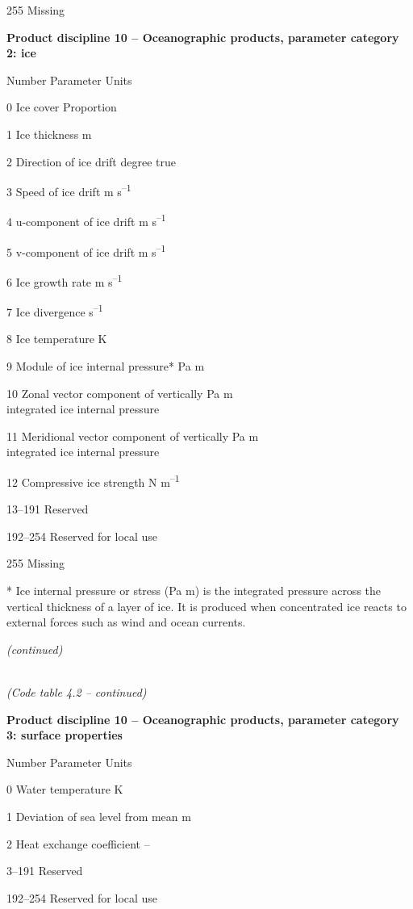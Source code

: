 255 Missing

\textbf{Product discipline 10 -- Oceanographic products, parameter category 2: ice}

Number Parameter Units

0 Ice cover Proportion

1 Ice thickness m

2 Direction of ice drift degree true

3 Speed of ice drift m s\textsuperscript{--1}

4 u-component of ice drift m s\textsuperscript{--1}

5 v-component of ice drift m s\textsuperscript{--1}

6 Ice growth rate m s\textsuperscript{--1}

7 Ice divergence s\textsuperscript{--1}

8 Ice temperature K

9 Module of ice internal pressure* Pa m

10 Zonal vector component of vertically Pa m\\
integrated ice internal pressure

11 Meridional vector component of vertically Pa m\\
integrated ice internal pressure

12 Compressive ice strength N m\textsuperscript{--1}

13--191 Reserved

192--254 Reserved for local use

255 Missing

* Ice internal pressure or stress (Pa m) is the integrated pressure across the vertical thickness of a layer of ice. It is produced when concentrated ice reacts to external forces such as wind and ocean currents.

\emph{(continued)}

\emph{\\
(Code table 4.2 -- continued)}

\textbf{Product discipline 10 -- Oceanographic products, parameter category 3: surface properties}

Number Parameter Units

0 Water temperature K

1 Deviation of sea level from mean m

2 Heat exchange coefficient --

3--191 Reserved

192--254 Reserved for local use

